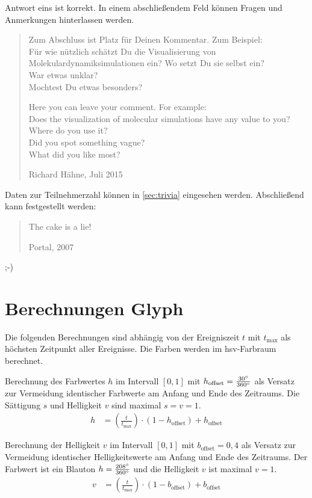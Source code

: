 Antwort eins ist korrekt. In einem abschließendem Feld können Fragen und Anmerkungen hinterlassen werden.

\blockquote[Richard Hähne, Juli 2015]{
	Zum Abschluss ist Platz für Deinen Kommentar. Zum Beispiel:\\
	Für wie nützlich schätzt Du die Visualisierung von Molekulardynamiksimulationen ein? Wo setzt Du sie selbst ein? \\
	War etwas unklar?\\
	Mochtest Du etwas besonders?
	
	Here you can leave your comment. For example:\\
	Does the visualization of molecular simulations have any value to you? Where do you use it?\\
	Did you spot something vague?\\
	What did you like most?
	
}

Daten zur Teilnehmerzahl können in \autoref{sec:trivia} eingesehen werden. Abschließend kann festgestellt werden:
\blockquote[Portal, 2007]{
	The cake is a lie!
}
;-)

\section{Berechnungen Glyph}\label{sec:berechnungen:glyph}
Die folgenden Berechnungen sind abhängig von der Ereigniszeit $t$ mit $t_{\text{max}}$ als höchsten Zeitpunkt aller Ereignisse. Die Farben werden im \gls{hsv}-Farbraum berechnet.

Berechnung des Farbwertes $h$ im Intervall $[0,1]$ mit $h_{\text{offset}} = \frac{30\degree}{360\degree}$ als Versatz zur Vermeidung identischer Farbwerte am Anfang und Ende des Zeitraums. Die Sättigung $s$ und Helligkeit $v$ sind maximal $s = v = 1$.
\begin{equation}
\begin{aligned}\label{eq:berechnungen:glyph-farbe}
h &= \left(\frac{t}{t_{\text{max}}}\right) \cdot (1 - h_{\text{offset}}) + h_{\text{offset}}
\end{aligned}
\end{equation}

Berechnung der Helligkeit $v$ im Intervall $[0,1]$ mit $b_{\text{offset}} = 0,4$ als Versatz zur Vermeidung identischer Helligkeitswerte am Anfang und Ende des Zeitraums. Der Farbwert ist ein Blauton $h = \frac{208\degree}{360\degree}$ und die Helligkeit $v$ ist maximal $v = 1$.
\begin{equation}
\begin{aligned}\label{eq:berechnungen:glyph-helligkeit}
v &= \left(\frac{t}{t_{\text{max}}}\right) \cdot (1 - b_{\text{offset}}) + b_{\text{offset}}
\end{aligned}
\end{equation}

